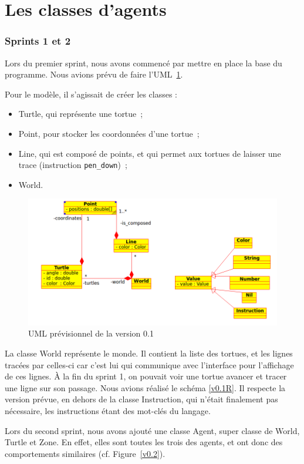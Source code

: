 \section{Les classes d'agents}
\subsubsection{Sprints 1 et 2}
Lors du premier sprint, nous avons commencé par mettre en place la base du programme. Nous avions prévu de faire l'UML~\ref{v0.1}.

 Pour le modèle, il s'agissait de créer les classes :
\begin{itemize}
\item Turtle, qui représente une tortue~;
\item Point, pour stocker les coordonnées d'une tortue~;
\item Line, qui est composé de points, et qui permet aux tortues de laisser une trace (instruction \verb|pen_down|)~;
\item World.
\end{itemize}


\begin{figure}[h]
\includegraphics[scale=0.5]{doc/report/uml/v01.png}
\caption{\label{v0.1} UML prévisionnel de la version 0.1}
\end{figure}


La classe World représente le monde. Il contient la liste des tortues, et les lignes tracées par celles-ci car c'est lui qui communique avec l'interface pour l'affichage de ces lignes.
À la fin du sprint 1, on pouvait voir une tortue avancer et tracer une ligne sur son passage.
Nous avions réalisé le schéma \ref{v0.1R}. Il respecte la version prévue, en dehors de la classe Instruction, qui n'était finalement pas nécessaire, les instructions étant des mot-clés du langage.

Lors du second sprint, nous avons ajouté une classe Agent, super classe de World, Turtle et Zone. En effet, elles sont toutes les trois des agents, et ont donc des comportements similaires (cf. Figure~\ref{v0.2}).

